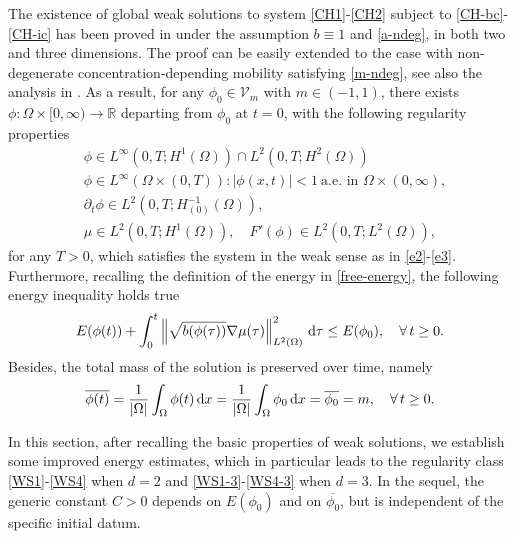 \documentclass[11pt,reqno]{amsart}
\theoremstyle{remark}
\def\R{\mathbb{R}}
\def\d{{\rm d}}
\numberwithin{equation}{section}
\def\d{{\rm d}}
\begin{document}
The existence of global weak solutions to system \eqref{CH1}-\eqref{CH2} subject to \eqref{CH-bc}-\eqref{CH-ic} has been proved in \cite{SP2013} under the assumption $b \equiv 1$ and \eqref{a-ndeg}, in both two and three dimensions. The proof can be easily extended to the case with non-degenerate concentration-depending mobility satisfying \eqref{m-ndeg}, see also the analysis in \cite{ADG2013}.
As a result, for any $\phi_0\in \mathcal{V}_m$ with $m\in (-1,1)$, there exists $\phi: \Omega \times [0,\infty)\to \R$ departing from $\phi_0$ at $t=0$, with the following regularity properties
\begin{align}
\label{S1}
&\phi \in  L^\infty(0,T; H^1(\Omega))\cap L^2(0,T;H^2(\Omega))
\\
\label{S2}
&\phi \in L^{\infty}(\Omega\times (0,T)):  |\phi(x,t)|<1  \ \text{a.e. in }\Omega\times (0,\infty),
\\
\label{S3}
&\partial_t \phi \in L^2(0,T; H_{(0)}^{-1}(\Omega)),
\\
\label{S4}
& \mu \in L^2(0,T;H^1(\Omega)), \quad F'(\phi)\in L^2( 0,T;L^2(\Omega)),
\end{align}
for any $T>0$, which satisfies the system in the weak sense as in \eqref{e2}-\eqref{e3}. Furthermore, recalling the definition of the energy in \eqref{free-energy},
the following energy inequality holds true
\begin{equation}
\label{EE}
E(\phi(t))+ \int_0^t \left\| \sqrt{b(\phi(\tau))}\nabla \mu(\tau) \right\|_{L^2(\Omega)}^2 \, \d \tau \leq  E(\phi_0), \quad \forall \, t \geq 0.
\end{equation}
Besides, the total mass of the solution is preserved over time, namely
\begin{equation}
\label{cons-mass}
\overline{\phi(t)}=\frac{1}{|\Omega|}\int_\Omega \phi(t)\, \d x=\frac{1}{|\Omega|}\int_\Omega \phi_0\, \d x=\overline{\phi_0}=m,\quad \forall \, t\geq 0.
\end{equation}
\medskip


In this section, after recalling the basic properties of weak solutions, we establish some improved energy estimates, which in particular leads to the regularity class \eqref{WS1}-\eqref{WS4} when $d=2$ and \eqref{WS1-3}-\eqref{WS4-3} when $d=3$. In the sequel, the generic constant $C>0$ depends on $E(\phi_0)$ and on $\overline{\phi_0}$, but is independent of the specific initial datum.
\end{document}
